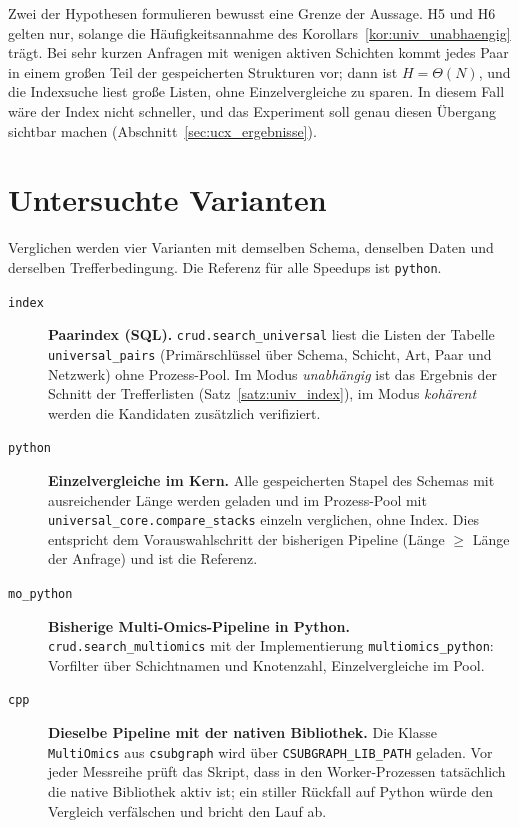 \documentclass[a4paper,12pt, twoside]{report}
\theoremstyle{definition}
\begin{document}
Zwei der Hypothesen formulieren bewusst eine Grenze der Aussage. H5 und H6 gelten nur, solange die Häufigkeitsannahme des Korollars~\ref{kor:univ_unabhaengig} trägt. Bei sehr kurzen Anfragen mit wenigen aktiven Schichten kommt jedes Paar in einem großen Teil der gespeicherten Strukturen vor; dann ist $H=\Theta(N)$, und die Indexsuche liest große Listen, ohne Einzelvergleiche zu sparen. In diesem Fall wäre der Index nicht schneller, und das Experiment soll genau diesen Übergang sichtbar machen (Abschnitt~\ref{sec:ucx_ergebnisse}).

\section{Untersuchte Varianten}
\label{sec:ucx_varianten}

Verglichen werden vier Varianten mit demselben Schema, denselben Daten und derselben Trefferbedingung. Die Referenz für alle Speedups ist \texttt{python}.

\begin{description}
	\item[\texttt{index}] \textbf{Paarindex (SQL).} \texttt{crud.search\_universal} liest die Listen der Tabelle \texttt{universal\_pairs} (Primärschlüssel über Schema, Schicht, Art, Paar und Netzwerk) ohne Prozess-Pool. Im Modus \emph{unabhängig} ist das Ergebnis der Schnitt der Trefferlisten (Satz~\ref{satz:univ_index}), im Modus \emph{kohärent} werden die Kandidaten zusätzlich verifiziert.
	\item[\texttt{python}] \textbf{Einzelvergleiche im Kern.} Alle gespeicherten Stapel des Schemas mit ausreichender Länge werden geladen und im Prozess-Pool mit \texttt{universal\_core.compare\_stacks} einzeln verglichen, ohne Index. Dies entspricht dem Vorauswahlschritt der bisherigen Pipeline (Länge $\ge$ Länge der Anfrage) und ist die Referenz.
	\item[\texttt{mo\_python}] \textbf{Bisherige Multi-Omics-Pipeline in Python.} \texttt{crud.search\_multiomics} mit der Implementierung \texttt{multiomics\_python}: Vorfilter über Schichtnamen und Knotenzahl, Einzelvergleiche im Pool.
	\item[\texttt{cpp}] \textbf{Dieselbe Pipeline mit der nativen Bibliothek.} Die Klasse \texttt{MultiOmics} aus \texttt{csubgraph} wird über \texttt{CSUBGRAPH\_LIB\_PATH} geladen. Vor jeder Messreihe prüft das Skript, dass in den Worker-Prozessen tatsächlich die native Bibliothek aktiv ist; ein stiller Rückfall auf Python würde den Vergleich verfälschen und bricht den Lauf ab.
\end{description}
\end{document}
